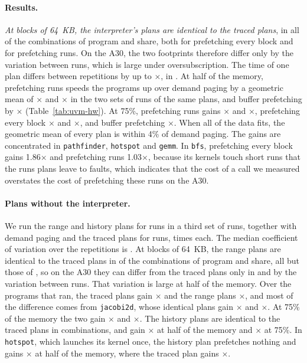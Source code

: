 \documentclass[11pt]{article}
\newcommand{\tabref}[1]{Table~\ref{#1}}
\newcommand{\code}[1]{\texttt{#1}}
\begin{document}
\paragraph{Results.} \textit{At blocks of 64~KB, the interpreter's plans are identical to the traced plans}, in all
\numHwPlansSame{} of the \numHwPlanConfigs{} combinations of program and share, both for prefetching every block and
for prefetching runs. On the A30, the two footprints therefore differ only by the variation between runs, which is
large under oversubscription. The time of one plan differs between repetitions by up to \numHwSpreadMax{}$\times$,
in \code{\numHwSpreadName{}}. At half of the memory, prefetching runs speeds the programs up over demand paging by a
geometric mean of \numHwHalfHyMinAll{}$\times$ and \numHwHalfTrMinAll{}$\times$ in the two sets of runs of the same
plans, and buffer prefetching by \numHwHalfBufAll{}$\times$ (\tabref{tab:uvm-hw}). At 75\%, prefetching runs gains
\numHwThreeQHyMinAll{}$\times$ and \numHwThreeQTrMinAll{}$\times$, prefetching every block
\numHwThreeQHyAll{}$\times$ and \numHwThreeQTrAll{}$\times$, and buffer prefetching \numHwThreeQBufAll{}$\times$. When
all of the data fits, the geometric mean of every plan is within 4\% of demand paging. The gains are concentrated in
\code{pathfinder}, \code{hotspot} and \code{gemm}. In \code{bfs}, prefetching every block gains 1.86$\times$ and
prefetching runs 1.03$\times$, because its kernels touch short runs that the runs plans leave to faults, which
indicates that the cost of a call we measured overstates the cost of prefetching these runs on the A30.

\paragraph{Plans without the interpreter.} We run the range and history plans for runs in a third set of runs,
together with demand paging and the traced plans for runs, \numHwCheapReps{} times each. The median coefficient of
variation over the repetitions is \numHwCheapCv{}. At blocks of 64~KB, the range plans are identical to the traced
plans in \numHwRangeSame{} of the \numHwPlanConfigs{} combinations of program and share, all but those of
\code{\numHwRangeDiffer{}}, so on the A30 they can differ from the traced plans only in \code{\numHwRangeDiffer{}}
and by the variation between runs. That variation is large at half of the memory. Over the
\numHwCheapHalfPrograms{} programs that ran, the traced plans gain \numHwCheapHalfTrMin{}$\times$ and the range
plans \numHwCheapHalfRangeMin{}$\times$, and most of the difference comes from \code{jacobi2d}, whose identical
plans gain \numHwCheapJacobiTrMin{}$\times$ and \numHwCheapJacobiRangeMin{}$\times$. At 75\% of the memory the two
gain \numHwCheapThreeQTrMin{}$\times$ and \numHwCheapThreeQRangeMin{}$\times$. The history plans are identical to
the traced plans in \numHwHistSame{} combinations, and gain \numHwCheapHalfHistMin{}$\times$ at half of the memory
and \numHwCheapThreeQHistMin{}$\times$ at 75\%. In \code{hotspot}, which launches its kernel once, the history
plan prefetches nothing and gains \numHwCheapHotspotHistMin{}$\times$ at half of the memory, where the traced plan
gains \numHwCheapHotspotTrMin{}$\times$.
\end{document}
